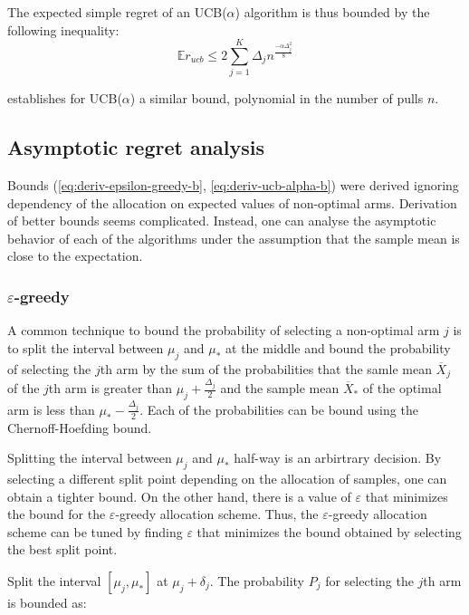 \documentclass{article}
\newcommand {\IE} {\ensuremath {\mathbb{E}}}
\begin{document}
The expected simple regret of an UCB($\alpha$) algorithm is thus
bounded by the following inequality:
\begin{equation}
\IE r_{ucb} \le 2\sum_{j=1}^K \Delta_jn^{\frac {-\alpha \Delta_j^2} 8}
\label{eq:deriv-ucb-alpha-b}
\end{equation}

\cite{Bubeck.pure} establishes for UCB($\alpha$) a similar bound,
polynomial in the number of pulls $n$.

\subsection{Asymptotic regret analysis}
\label{app:derivations-asym}


Bounds (\ref{eq:deriv-epsilon-greedy-b}, \ref{eq:deriv-ucb-alpha-b}) were
derived ignoring dependency of the allocation on expected values
of non-optimal arms. Derivation of better bounds seems
complicated. Instead, one can analyse the asymptotic behavior of each of the
algorithms under the assumption that the sample mean is close to the expectation.

\subsubsection{$\varepsilon$-greedy}
\label{app:derivations-asym-eps}


A common technique \cite{Auer.ucb} to bound the probability of
selecting a non-optimal arm $j$ is to split the interval between
$\mu_j$ and $\mu_*$ at the middle and bound the probability of
selecting the $j$th arm by the sum of the probabilities that the samle
mean $\overline X_j$ of the $j$th arm is greater than $\mu_j+\frac
{\Delta_j} 2$ and the sample mean $\overline X_*$ of the optimal arm is
less than $\mu_*- \frac {\Delta_j} 2$. Each of the probabilities can
be bound using the Chernoff-Hoefding bound.

Splitting the interval between $\mu_j$ and $\mu_*$ half-way is an
arbirtrary decision. By selecting a different split point
depending on the allocation of samples, one can obtain a tighter
bound. On the other hand, there is a value of $\varepsilon$ that
minimizes the bound for the $\varepsilon$-greedy allocation scheme.
Thus, the  $\varepsilon$-greedy allocation scheme can be tuned by
finding $\varepsilon$ that minimizes the bound obtained by
selecting the best split point. 

Split the interval $[\mu_j, \mu_*]$ at $\mu_j+\delta_j$. The
probability $P_j$ for selecting the $j$th arm is bounded as:
\end{document}
